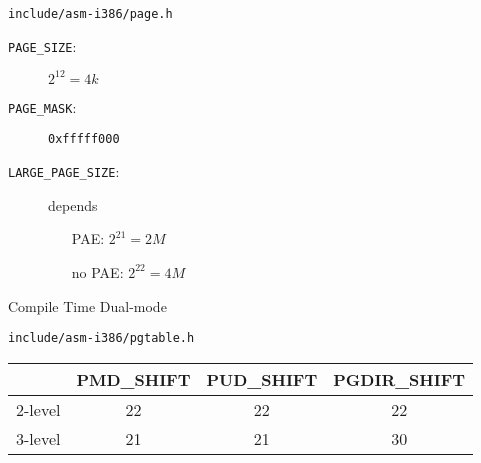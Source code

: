 \begin{frame}%
  \begin{block}{\texttt{include/asm-i386/page.h}}
    \begin{center}
    \end{center}
  \end{block}
  \begin{description}
  \item[\texttt{PAGE\_SIZE}:] $2^{12} = 4k$
  \item[\texttt{PAGE\_MASK}:] \texttt{0xfffff000}
  \item[\texttt{LARGE\_PAGE\_SIZE}:] depends
    \begin{itemize}
    \item[PAE:] $2^{21} = 2M$
    \item[no PAE:] $2^{22} = 4M$
    \end{itemize}
  \end{description}
\end{frame}

\begin{frame}{Compile Time Dual-mode}
  \begin{block}{\texttt{include/asm-i386/pgtable.h}}
    \begin{center}
    \end{center}
  \end{block}
  \begin{center}
    \begin{small}{\ttfamily
      \begin{tabular}{l|ccc}
        &PMD\_SHIFT&PUD\_SHIFT&PGDIR\_SHIFT\\\hline
        2-level&22&22&22\\
        3-level&21&21&30
      \end{tabular}}
    \end{small}
  \end{center}
  \begin{center}
  \end{center}
\end{frame}

